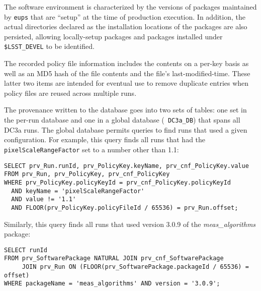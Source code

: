 The software environment is characterized by the versions of packages
maintained by {\tt eups} that are ``setup'' at the time of production
execution.  In addition, the actual directories declared as the
installation locations of the packages are also persisted, allowing
locally-setup packages and packages installed under {\tt \$LSST\_DEVEL} to
be identified.

The recorded policy file information includes the contents on a per-key
basis as well as an MD5 hash of the file contents and the file's
last-modified-time.  These latter two items are intended for eventual
use to remove duplicate entries when policy files are reused across
multiple runs.

The provenance written to the database goes into two sets of tables: one
set in the per-run database and one in a global database ({\tt
DC3a\_DB}) that spans all DC3a runs.  The global database permits
queries to find runs that used a given configuration.  For example, this
query finds all runs that had the {\tt pixelScaleRangeFactor} set to a
number other than 1.1:

\begin{verbatim}
SELECT prv_Run.runId, prv_PolicyKey.keyName, prv_cnf_PolicyKey.value
FROM prv_Run, prv_PolicyKey, prv_cnf_PolicyKey
WHERE prv_PolicyKey.policyKeyId = prv_cnf_PolicyKey.policyKeyId
  AND keyName = 'pixelScaleRangeFactor'
  AND value != '1.1'
  AND FLOOR(prv_PolicyKey.policyFileId / 65536) = prv_Run.offset;
\end{verbatim}

Similarly, this query finds all runs that used version 3.0.9 of the {\it
meas\_algorithms} package:

\begin{verbatim}
SELECT runId
FROM prv_SoftwarePackage NATURAL JOIN prv_cnf_SoftwarePackage
     JOIN prv_Run ON (FLOOR(prv_SoftwarePackage.packageId / 65536) = offset)
WHERE packageName = 'meas_algorithms' AND version = '3.0.9';
\end{verbatim}

